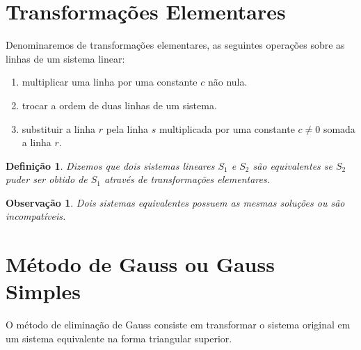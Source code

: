 \documentclass[
	12pt,				%
	openright,			%
	twoside,			%
	a4paper,			%
	english,			%
	french,				%
	brazil,				%
	sumario=tradicional
]{abntex2}
\newtheorem{remark}{Observação}
\newtheorem{definition}{Definição}
\numberwithin{example}{chapter}
\numberwithin{remark}{chapter}
\numberwithin{definition}{chapter}
\numberwithin{figure}{chapter}
\begin{document}
\section{Transformações Elementares}

Denominaremos de transformações elementares, as seguintes operações sobre as linhas de um sistema linear:

\begin{enumerate}
    \item multiplicar uma linha por uma constante $c$ não nula.

    \item trocar a ordem de duas linhas de um sistema.

    \item substituir a linha $r$ pela linha $s$ multiplicada por uma constante $c\neq 0$ somada a linha $r$.
\end{enumerate}

\begin{definition}
    Dizemos que dois sistemas lineares $S_1$ e $S_2$ são equivalentes se $S_2$ puder ser obtido de $S_1$ através de transformações elementares.
\end{definition}

\begin{remark}
    Dois sistemas equivalentes possuem as mesmas soluções ou são incompatíveis.
\end{remark}

\section{Método de Gauss ou Gauss Simples}

O método de eliminação de Gauss consiste em transformar o sistema original em um sistema equivalente na forma triangular superior.
\end{document}

